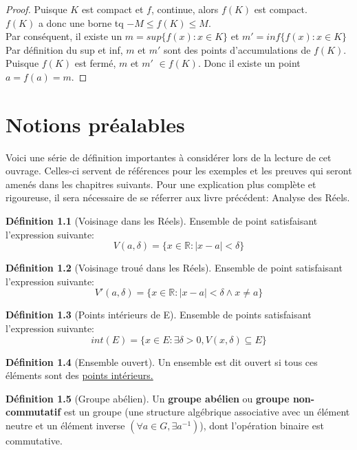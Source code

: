\documentclass[12pt]{book}
\let\Bbb\mathbb
\theoremstyle{definition}
\newtheorem{definition}{Définition}[section]
\begin{document}
\begin{proof}
    Puisque $K$ est compact et $f$, continue, alors $f(K)$ est compact.\\
    $f(K)$ a donc une borne tq $-M \leq f(K) \leq M$.\\
    Par conséquent, il existe un $m = sup\{f(x): x \in K\}$ et $m' = inf\{f(x): x \in K\}$\\
    Par définition du sup et inf, $m$ et  $m'$ sont des points d'accumulations de $f(K)$.\\
    Puisque $f(K)$ est fermé, $m$ et $m'$ $\in f(K)$. Donc il existe un point $a = f(a) = m$.
\end{proof}
\appendix
\chapter{Notions préalables}
Voici une série de définition importantes à considérer lors de la lecture de cet ouvrage. Celles-ci servent
de références pour les exemples et les preuves qui seront amenés dans les chapitres suivants. Pour une explication
plus complète et rigoureuse, il sera nécessaire de se réferrer aux livre précédent: Analyse des Réels.

\begin{definition}[Voisinage dans les Réels]
    \label{def:voisinage_reels}
    Ensemble de point satisfaisant l'expression
    suivante: $$V(a, \delta) = \{ x \in \Bbb R : |x - a| < \delta \}$$
\end{definition}

\begin{definition}[Voisinage troué dans les Réels]
    \label{def:voisinage_troue_reels}
    Ensemble de point satisfaisant l'expression
    suivante: $$V'(a, \delta) = \{ x \in \Bbb R : |x - a| < \delta \land x \neq a \}$$
\end{definition}

\begin{definition}[Points intérieurs de E]
    \label{def:point_int}
    Ensemble de points satisfaisant l'expression
    suivante: $$int(E) = \{ x \in E : \exists \delta > 0, V(x, \delta) \subseteq E \} $$
\end{definition}

\begin{definition}[Ensemble ouvert]
    \label{def:ensemble_ouvert}
    Un ensemble est dit ouvert si tous ces éléments sont des \hyperref[def:point_int]{points intérieurs.}
\end{definition}

\begin{definition}[Groupe abélien]
    \label{def:groupe_abelien}
    Un \textbf{groupe abélien} ou \textbf{groupe non-commutatif} est un groupe
    (une structure algébrique associative avec un élément neutre et un élément inverse $(\forall a \in G, \exists a^{-1})$), 
    dont l'opération binaire est commutative.
\end{definition}
\end{document}
